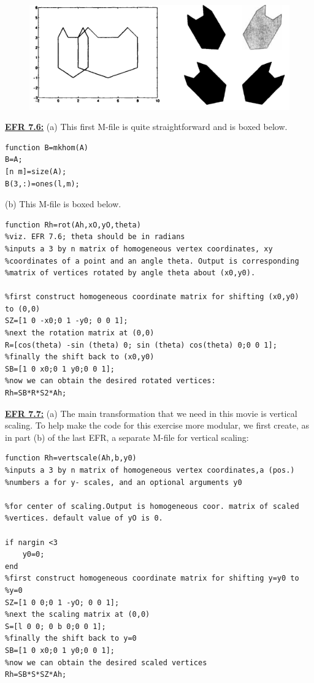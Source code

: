 \documentclass[../main.tex]{subfiles}
\begin{document}
\begin{figure}[H]
    \centering
    \includegraphics[width=0.7\linewidth]{44}
    \label{pfig:ch13_44}
\end{figure}
\textbf{\underline{EFR 7.6:}} (a) This first M-file is quite straightforward and is boxed below. 
\begin{lstlisting}[numbers=none]
function B=mkhom(A) 
B=A; 
[n m]=size(A); 
B(3,:)=ones(l,m); 
\end{lstlisting}
(b) This M-file is boxed below. 
\begin{lstlisting}[numbers=none]
function Rh=rot(Ah,xO,yO,theta) 
%viz. EFR 7.6; theta should be in radians 
%inputs a 3 by n matrix of homogeneous vertex coordinates, xy 
%coordinates of a point and an angle theta. Output is corresponding 
%matrix of vertices rotated by angle theta about (x0,y0). 

%first construct homogeneous coordinate matrix for shifting (x0,y0) 
to (0,0) 
SZ=[1 0 -x0;0 1 -y0; 0 0 1]; 
%next the rotation matrix at (0,0) 
R=[cos(theta) -sin (theta) 0; sin (theta) cos(theta) 0;0 0 1]; 
%finally the shift back to (x0,y0) 
SB=[1 0 x0;0 1 y0;0 0 1]; 
%now we can obtain the desired rotated vertices: 
Rh=SB*R*S2*Ah; 
\end{lstlisting}
\textbf{\underline{EFR 7.7:}} (a) The main transformation that we need in this movie is vertical scaling. To help make 
the code for this exercise more modular, we first create, as in part (b) of the last EFR, a separate M-file 
for vertical scaling: 
\begin{lstlisting}[numbers=none]
function Rh=vertscale(Ah,b,y0)
%inputs a 3 by n matrix of homogeneous vertex coordinates,a (pos.)
%numbers a for y- scales, and an optional arguments y0 

%for center of scaling.Output is homogeneous coor. matrix of scaled 
%vertices. default value of yO is 0. 

if nargin <3 
	y0=0; 
end 
%first construct homogeneous coordinate matrix for shifting y=y0 to 
%y=0 
SZ=[1 0 0;0 1 -yO; 0 0 1]; 
%next the scaling matrix at (0,0) 
S=[l 0 0; 0 b 0;0 0 1]; 
%finally the shift back to y=0 
SB=[1 0 x0;0 1 y0;0 0 1]; 
%now we can obtain the desired scaled vertices 
Rh=SB*S*SZ*Ah; 
\end{lstlisting}
\end{document}
